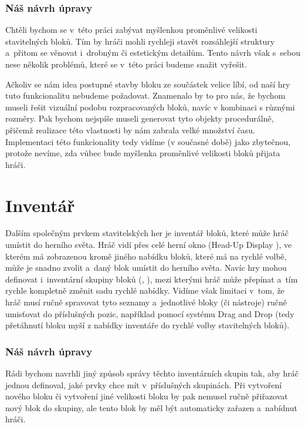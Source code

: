 \subsubsection{Náš návrh úpravy}
Chtěli bychom se v~této práci zabývat myšlenkou proměnlivé velikosti stavitelných bloků. Tím by hráči mohli rychleji stavět rozsáhlejší struktury a~přitom se věnovat i~drobným či estetickým detailům. Tento návrh však s~sebou nese několik problémů, které se v~této práci budeme snažit vyřešit.

Ačkoliv se nám idea postupné stavby bloku ze součástek velice líbí, od naší hry tuto funkcionalitu nebudeme požadovat. Znamenalo by to pro nás, že bychom museli řešit vizuální podobu rozpracovaných bloků, navíc v kombinaci s různými rozměry. Pak bychom nejspíše museli generovat tyto objekty procedurálně, přičemž realizace této vlastnosti by nám zabrala velké množství času. Implementaci této funkcionality tedy vidíme (v současné době) jako zbytečnou, protože nevíme, zda vůbec bude myšlenka proměnlivé velikosti bloků přijata hráči.


\section{Inventář}
Dalším společným prvkem stavitelských her je inventář bloků, které může hráč umístit do herního světa. Hráč vidí přes celé herní okno \HUD{} (Head-Up Display \citep{hud_terminology}), ve kterém má zobrazenou kromě jiného nabídku bloků, které má na rychlé volbě, může je snadno zvolit a~daný blok umístit do herního světa. Navíc hry mohou definovat i~inventární skupiny bloků (\SE{}, \ME{}), mezi kterými hráč může přepínat a~tím rychle kompletně změnit sadu rychlé nabídky. Vidíme však limitaci v~tom, že hráč musí ručně spravovat tyto seznamy a~jednotlivé bloky (či nástroje) ručně umisťovat do příslušných pozic, například pomocí systému Drag and Drop (tedy přetáhnutí bloku myší z nabídky inventáře do rychlé volby stavitelných bloků).


\subsubsection{Náš návrh úpravy}
Rádi bychom navrhli jiný způsob správy těchto inventárních skupin tak, aby hráč jednou definoval, jaké prvky chce mít v~příslušných skupinách. Při vytvoření nového bloku či vytvoření jiné velikosti bloku by pak nemusel ručně přiřazovat nový blok do skupiny, ale tento blok by měl být automaticky zařazen a~nabídnut hráči.  


